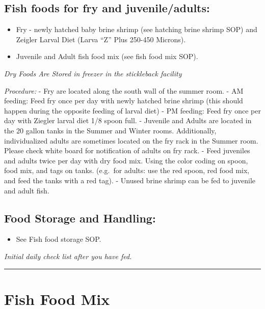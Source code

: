 \documentclass[
]{book}
\providecommand{\tightlist}{%
  \setlength{\itemsep}{0pt}\setlength{\parskip}{0pt}}
\begin{document}
\hypertarget{fish-foods-for-fry-and-juvenileadults}{%
\subsection{Fish foods for fry and juvenile/adults:}\label{fish-foods-for-fry-and-juvenileadults}}

\begin{itemize}
\tightlist
\item
  Fry - newly hatched baby brine shrimp (see hatching brine shrimp SOP) and Zeigler Larval Diet (Larva ``Z'' Plus 250-450 Microns).
\item
  Juvenile and Adult fish food mix (see fish food mix SOP).
\end{itemize}

\emph{Dry Foods Are Stored in freezer in the stickleback facility}

\emph{Procedure:}
- Fry are located along the south wall of the summer room.
- AM feeding: Feed fry once per day with newly hatched brine shrimp (this should happen during the opposite feeding of larval diet)
- PM feeding: Feed fry once per day with Ziegler larval diet 1/8 spoon full.
- Juvenile and Adults are located in the 20 gallon tanks in the Summer and Winter rooms. Additionally, individualized adults are sometimes located on the fry rack in the Summer room. Please check white board for notification of adults on fry rack.
- Feed juveniles and adults twice per day with dry food mix. Using the color coding on spoon, food mix, and tags on tanks. (e.g.~for adults: use the red spoon, red food mix, and feed the tanks with a red tag).
- Unused brine shrimp can be fed to juvenile and adult fish.

\hypertarget{food-storage-and-handling}{%
\subsection{Food Storage and Handling:}\label{food-storage-and-handling}}

\begin{itemize}
\tightlist
\item
  See Fish food storage SOP.
\end{itemize}

\emph{Initial daily check list after you have fed. }

\begin{center}\rule{0.5\linewidth}{0.5pt}\end{center}

\hypertarget{fish-food-mix}{%
\section{Fish Food Mix}\label{fish-food-mix}}
\end{document}
